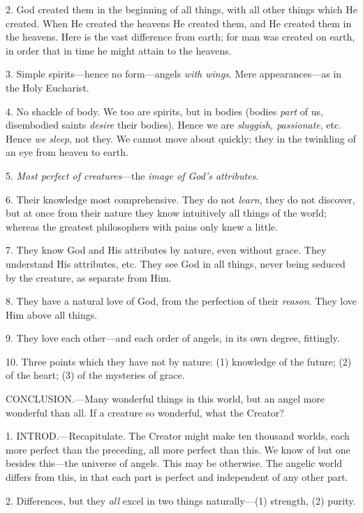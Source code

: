2. God created them in the beginning of all
things, with all other things which He created. When He created the
heavens He created them, and He created them in the heavens. Here is
the vast difference from earth; for man was created on earth, in order
that in time he might attain to the heavens.

3. Simple spirits—hence no form—angels \emph{with
wings}. Mere appearances—as in the Holy Eucharist.

4. No shackle of body. We too are spirits, but in
bodies (bodies \emph{part} of us, disembodied saints \emph{desire}
their bodies). Hence we are \emph{sluggish, passionate}, etc. Hence \emph{we
sleep}, not they. We cannot move about quickly; they in the
twinkling of an eye from heaven to earth.

5. \emph{Most perfect of creatures}—the \emph{image
of God's attributes}.

6. Their knowledge most comprehensive. They do
not \emph{learn}, they do not discover, but at once from their nature
they know intuitively all things of the world; whereas the greatest
philosophers with pains only knew a little.

7. They know God and His attributes by nature,
even without grace. They understand His attributes, etc. They see God
in all things, never being seduced by the creature, as separate from
Him.

8. They have a natural love of God, from the
perfection of their \emph{reason}. They love Him above all things.

9. They love each other—and each order of
angels, in its own degree, fittingly.

10. Three points which they have not by nature:
(1) knowledge of the future; (2) of the heart; (3) of the mysteries of
grace.

CONCLUSION.—Many
wonderful things in this world, but an angel more wonderful than all.
If a creature so wonderful, what the Creator?


1. INTROD.—Recapitulate.
The Creator might make ten thousand worlds, each more perfect than the
preceding, all more perfect than this. We know of but one besides
this—the universe of angels. This may be otherwise. The angelic
world differs from this, in that each part is perfect and independent
of any other part.

2. Differences, but they \emph{all} excel in two
things naturally—(1) strength, (2) purity.

